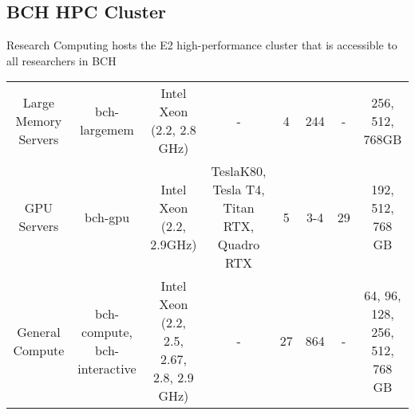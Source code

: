 \documentclass[11pt]{amsart}
\begin{document}
\hypertarget{x-bch-hpc-cluster}{\subsection*{BCH HPC Cluster}}
Research Computing hosts the E2 high-performance cluster that is accessible to all researchers in BCH


\begin{center}
\begin{tabular}{|c|c|c|c|c|c|c|c|}
\hline
Large Memory Servers & bch-largemem & Intel Xeon (2.2, 2.8 GHz) & - & 4 & 244 & - & 256, 512, 768GB \\ 
GPU Servers & bch-gpu & Intel Xeon (2.2, 2.9GHz) & TeslaK80, Tesla T4, Titan RTX, Quadro RTX & 5 & 3-4 & 29 & 192, 512, 768 GB \\ 
General Compute & bch-compute, bch-interactive & Intel Xeon (2.2, 2.5, 2.67, 2.8, 2.9 GHz) & - & 27 & 864 & - & 64, 96, 128, 256, 512, 768 GB \\ 
\hline
\end{tabular}
\end{center}
\end{document}
